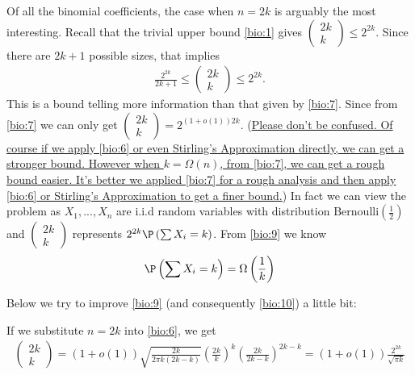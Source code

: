 \documentclass{article}
\begin{document}
Of all the binomial coefficients, the case when $n=2 k$ is arguably the most interesting. Recall that the trivial upper bound \cref{bio:1} gives $\left(\begin{array}{c}2 k \\ k\end{array}\right)\le 2^{2 k}$. Since there are $2 k+1$ possible sizes, that implies 
\begin{align}
    \frac{2^{2 k}}{2 k+1} \leq\left(\begin{array}{c}2 k \\ k\end{array}\right) \leq 2^{2 k}. \label{bio:9}
\end{align}
This is a bound telling more information than that given by \cref{bio:7}. 
Since from \cref{bio:7} we can only get $\left(\begin{array}{c}2 k \\ k\end{array}\right)=2^{(1+o(1))2k}$. (\uline{Please don't be confused. Of course if we apply \cref{bio:6} or even Stirling's Approximation directly, we can get a stronger bound. However when $k=\Omega(n)$, from \cref{bio:7}, we can get a rough bound easier. It's better we applied \cref{bio:7} for a rough analysis and then apply  \cref{bio:6} or Stirling's Approximation to get a finer bound.})
In fact we can view the problem as $X_1,..., X_n$ are i.i.d random variables with distribution $\mathrm {Bernoulli} \left({\frac {1}{2}}\right)$ and $\left(\begin{array}{c}2 k \\ k\end{array}\right)$ represents $2^{2k}\P\left(\sum X_i=k\right)$. 
From \cref{bio:9} we know 
\begin{align}
    \P\left(\sum X_i=k\right)=\Omega \left(\frac{1}{k}\right) \label{bio:10}
\end{align}

Below we try to improve \cref{bio:9}  (and consequently \cref{bio:10}) a little bit:

If we substitute $n=2 k$ into \cref{bio:6}, we get
\begin{align}
\left(\begin{array}{c}
2 k \\
k
\end{array}\right)=(1+o(1)) \sqrt{\frac{2 k}{2 \pi k(2 k-k)}}\left(\frac{2 k}{k}\right)^{k}\left(\frac{2 k}{2 k-k}\right)^{2 k-k}=(1+o(1))  \frac{2^{2 k}}{\sqrt{\pi k}} \label{bio:8}
\end{align}
\end{document}
